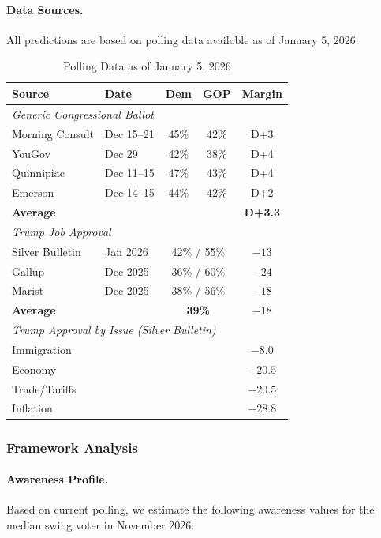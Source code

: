 \paragraph{Data Sources.}
All predictions are based on polling data available as of January 5, 2026:

\begin{table}[htbp]
\centering
\small
\begin{tabular}{llccc}
\toprule
\textbf{Source} & \textbf{Date} & \textbf{Dem} & \textbf{GOP} & \textbf{Margin} \\
\midrule
\multicolumn{5}{l}{\textit{Generic Congressional Ballot}} \\
Morning Consult & Dec 15--21 & 45\% & 42\% & D+3 \\
YouGov & Dec 29 & 42\% & 38\% & D+4 \\
Quinnipiac & Dec 11--15 & 47\% & 43\% & D+4 \\
Emerson & Dec 14--15 & 44\% & 42\% & D+2 \\
\textbf{Average} & & & & \textbf{D+3.3} \\
\midrule
\multicolumn{5}{l}{\textit{Trump Job Approval}} \\
Silver Bulletin & Jan 2026 & \multicolumn{2}{c}{42\% / 55\%} & $-13$ \\
Gallup & Dec 2025 & \multicolumn{2}{c}{36\% / 60\%} & $-24$ \\
Marist & Dec 2025 & \multicolumn{2}{c}{38\% / 56\%} & $-18$ \\
\textbf{Average} & & \multicolumn{2}{c}{\textbf{39\%}} & \textbf{$-18$} \\
\midrule
\multicolumn{5}{l}{\textit{Trump Approval by Issue (Silver Bulletin)}} \\
Immigration & & \multicolumn{2}{c}{} & $-8.0$ \\
Economy & & \multicolumn{2}{c}{} & $-20.5$ \\
Trade/Tariffs & & \multicolumn{2}{c}{} & $-20.5$ \\
Inflation & & \multicolumn{2}{c}{} & $-28.8$ \\
\bottomrule
\end{tabular}
\caption{Polling Data as of January 5, 2026}
\end{table}

\subsubsection{Framework Analysis}

\paragraph{Awareness Profile.}
Based on current polling, we estimate the following awareness values for 
the median swing voter in November 2026:

